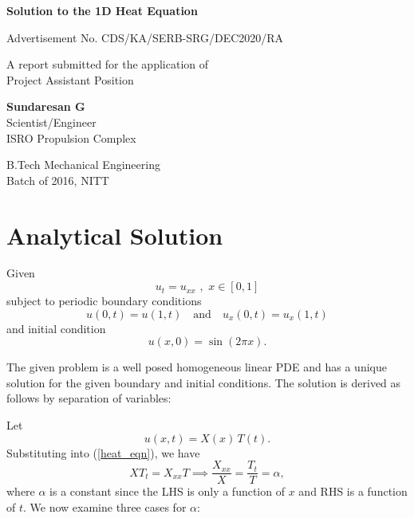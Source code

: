 \documentclass[12pt]{article}
\author{Sundaresan G}
\begin{document}
	
\begin{titlepage}
	\begin{center}
		\vspace*{1cm}
		
		\textbf{\Large{Solution to the 1D Heat Equation}}
		
		\vspace{0.5cm}
		Advertisement No. CDS/KA/SERB-SRG/DEC2020/RA
		
		\vspace{1.5cm}
		
		A report submitted for the application of\\
		Project Assistant Position
		
		
		\vfill
		
		\textbf{\large{Sundaresan G}}\\
		Scientist/Engineer\\
		ISRO Propulsion Complex
		
		\vspace{0.8cm}
		
		B.Tech Mechanical Engineering\\
		Batch of 2016, NITT\\
		
	\end{center}
\end{titlepage}
\tableofcontents

	\section{Analytical Solution}
	Given 
	\begin{equation} \label{heat_eqn}
	 u_t=u_{xx} \,\,,\,\, x\in [0,1] 
	\end{equation}
	subject to periodic boundary conditions 
	\begin{equation*}
	 u(0,t)=u(1,t) \quad \text{and} \quad u_x(0,t)=u_x(1,t)    
	\end{equation*}
	 and initial condition
	 \begin{equation}\label{initial}
	 u(x,0)=\sin(2\pi x).    
	 \end{equation}

	The given problem is a well posed homogeneous linear PDE and has a unique solution for the given boundary and initial conditions. The solution is derived as follows by separation of variables:
	
	Let 
	\begin{equation}
	    u(x,t)=X(x)\,T(t).
	\end{equation}
	Substituting into (\ref{heat_eqn}), we have 
	\begin{equation*}
	    XT_t=X_{xx}T \implies \frac{X_{xx}}{X}=\frac{T_t}{T}=\alpha,
	\end{equation*}
	where $\alpha$ is a constant since the LHS is only a function of $x$ and RHS is a function of $t$. We now examine three cases for $\alpha$:
	
\end{document}
